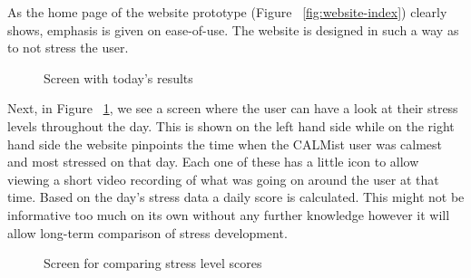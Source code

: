 \documentclass{scrartcl}
\begin{document}
As the home page of the website prototype (Figure ~\ref{fig:website-index}) clearly shows, emphasis is given on ease-of-use. The website is designed in such a way as to not stress the user.

\begin{figure}[htb]
	\begin{center}
			\end{center}
	\caption{Screen with today's results}
	\label{fig:website-todays-results}
\end{figure}

Next, in Figure ~\ref{fig:website-todays-results}, we see a screen where the user can have a look at their stress levels throughout the day. This is shown on the left hand side while on the right hand side the website pinpoints the time when the CALMist user was calmest and most stressed on that day. Each one of these has a little icon to allow viewing a short video recording of what was going on around the user at that time. Based on the day's stress data a daily score is calculated. This might not be informative too much on its own without any further knowledge however it will allow long-term comparison of stress development.

\begin{figure}[htb]
	\begin{center}
			\end{center}
	\caption{Screen for comparing stress level scores}
	\label{fig:website-compare-results}
\end{figure}
\end{document}
